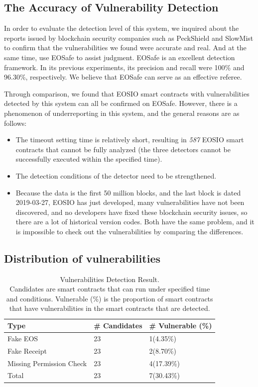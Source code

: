 \documentclass[a4paper, 10pt, conference, twocolumn]{ieeeconf}       %
\begin{document}
\subsection{The Accuracy of Vulnerability Detection}
In order to evaluate the detection level of this system,
we inquired about the reports issued by blockchain security companies such as PeckShield\cite{peckshield:2020} and SlowMist\cite{slowmist:2020} to confirm that the vulnerabilities we found were accurate and real.
And at the same time, use EOSafe to assist judgment. EOSafe is an excellent detection framework.
In its previous experiments,
its precision and recall were 100\% and 96.30\%,
respectively. We believe that EOSafe can serve as an effective referee.

Through comparison,
we found that EOSIO smart contracts with vulnerabilities detected by this system can all be confirmed on EOSafe.
However, there is a phenomenon of underreporting in this system,
and the general reasons are as follows:
\begin{itemize}
    \item The timeout setting time is relatively short, resulting in \emph{587} EOSIO smart contracts that cannot be fully analyzed (the three detectors cannot be successfully executed within the specified time).
    \item The detection conditions of the detector need to be strengthened.
    \item Because the data is the first 50 million blocks, and the last block is dated 2019-03-27, EOSIO has just developed, many vulnerabilities have not been discovered, and no developers have fixed these blockchain security issues, so there are a lot of historical version codes. Both have the same problem, and it is impossible to check out the vulnerabilities by comparing the differences.
\end{itemize}

\subsection{Distribution of vulnerabilities}

\begin{table}[htp]
    \centering
    \begin{tabular}{|l|l|l|}
    \hline
    Type                     & \# Candidates & \# Vulnerable (\%) \\ \hline
    Fake EOS                 & 23            & 1(4.35\%)           \\
    Fake Receipt             & 23            & 2(8.70\%)           \\
    Missing Permission Check & 23            & 4(17.39\%)          \\ \hline
    Total                    & 23            & 7(30.43\%)          \\ \hline
    \end{tabular}
    \caption{Vulnerabilities Detection Result. \\
    Candidates are smart contracts that can run under specified time and conditions. 
    Vulnerable (\%) is the proportion of smart contracts that have vulnerabilities in the smart contracts that are detected.}
\end{table}
\end{document}
